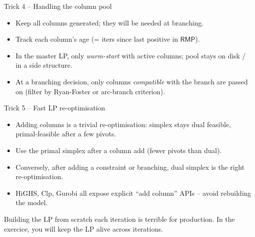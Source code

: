 \documentclass[10pt,aspectratio=169]{beamer}
\newcommand{\rmp}{\mathsf{RMP}}
\begin{document}
\begin{frame}{Trick 4 -- Handling the column pool}
  \begin{itemize}\small
    \item Keep all columns generated; they will be needed at branching.
    \item Track each column's \alert{age} (= iters since last positive in $\rmp$).
    \item In the master LP, only \emph{warm-start} with active columns; pool
          stays on disk / in a side structure.
    \item At a branching decision, only columns \emph{compatible} with the
          branch are passed on (filter by Ryan-Foster or arc-branch criterion).
  \end{itemize}
\end{frame}

\begin{frame}{Trick 5 -- Fast LP re-optimisation}
  \begin{itemize}\small
    \item Adding columns is a \alert{trivial} re-optimisation: simplex stays
          dual feasible, primal-feasible after a few pivots.
    \item Use the \alert{primal simplex} after a column add (fewer pivots
          than dual).
    \item Conversely, after \alert{adding a constraint or branching},
          dual simplex is the right re-optimisation.
    \item HiGHS, Clp, Gurobi all expose explicit ``add column'' APIs --
          avoid rebuilding the model.
  \end{itemize}
  \medskip
  \begin{warnbox}[Beware]
    Building the LP from scratch each iteration is terrible for production. In the exercice, you will keep the LP alive across iterations.
  \end{warnbox}
\end{frame}
\end{document}
